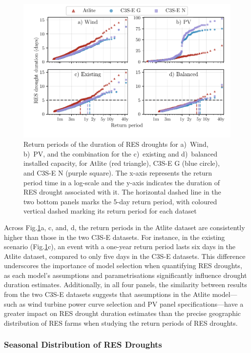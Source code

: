 \documentclass[a4paper, 11p1t]{article}
\begin{document}
\begin{figure}[!ht]
	\centering
	\includegraphics{droughts_return_periods.pdf}
	\caption{Return periods of the duration of RES droughts for a)~Wind, b)~PV, and the combination for the c)~existing and d)~balanced installed capacity, for Atlite (red triangle), C3S-E G (blue circle), and C3S-E N (purple square). The x-axis represents the return period time in a log-scale and the y-axis indicates the duration of RES drought associated with it. The horizontal dashed line in the two bottom panels marks the 5-day return period, with coloured vertical dashed marking its return period for each dataset}
	\label{fig:return_periods}
\end{figure}

Across Fig.\ref{fig:return_periods}a, c, and, d, the return periods in the Atlite dataset are consistently higher than those in the two C3S-E datasets. For instance, in the existing scenario (Fig.\ref{fig:return_periods}c), an event with a one-year return period lasts six days in the Atlite dataset, compared to only five days in the C3S-E datasets. This difference underscores the importance of model selection when quantifying RES droughts, as each model’s assumptions and parametrisations significantly influence drought duration estimates. Additionally, in all four panels, the similarity between results from the two C3S-E datasets suggests that assumptions in the Atlite model—such as wind turbine power curve selection and PV panel specifications—have a greater impact on RES drought duration estimates than the precise geographic distribution of RES farms when studying the return periods of RES droughts.



\newpage
\subsubsection{Seasonal Distribution of RES Droughts}
\end{document}
